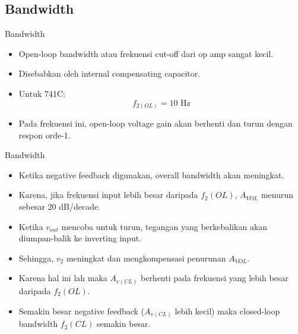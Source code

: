 \subsection{Bandwidth}

\begin{frame}{Bandwidth}
	\begin{itemize}
		\item Open-loop bandwidth atau frekuensi cut-off dari op amp sangat kecil.
		\item Disebabkan oleh internal compensating capacitor.
		\item Untuk 741C: $$ f_{2(OL)} = 10 \text{ Hz} $$
		\item Pada frekuensi ini, open-loop voltage gain akan berhenti dan turun dengan respon orde-1.
	\end{itemize}
\end{frame}

\begin{frame}{Bandwidth}
	\begin{itemize}
		\item Ketika negative feedback digunakan, overall bandwidth akan meningkat.
		\item Karena, jika frekuensi input lebih besar daripada $ f_2(OL) $, $ A_{VOL} $ menurun sebesar 20 dB/decade.
		\item Ketika $ v_{out} $ mencoba untuk turun, tegangan yang berkebalikan akan diumpan-balik ke inverting input.
		\item Sehingga, $ v_2 $ meningkat dan mengkompensasi penurunan $ A_{VOL} $.
		\item Karena hal ini lah maka $ A_{v(CL)} $ berhenti pada frekuensi yang lebih besar daripada $ f_2(OL) $.
		\item Semakin besar negative feedback ($ A_{v(CL)} $ lebih kecil) maka closed-loop bandwidth $ f_2(CL) $ semakin besar.
	\end{itemize}
\end{frame}

